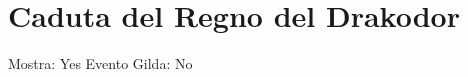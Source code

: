 \section{Caduta del Regno del
Drakodor}\label{caduta-del-regno-del-drakodor}

Mostra: Yes Evento Gilda: No
